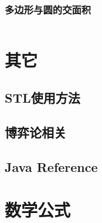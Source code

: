 \documentclass[a4paper,openany]{book}
\newcommand{\cppcode}[1]{
    \inputminted[mathescape,
    			 tabsize=4,
    			 linenos,
    			 frame=single,
    			 framesep=2mm,
    			 breakaftergroup=true,
    			 breakautoindent=true,
    			 breakbytoken=true,
    			 breaklines=true
    ]{cpp}{#1}
}
\begin{document}
\begin{spacing}{1.0}
			\subsection{多边形与圆的交面积}
				\cppcode{Source/Computational-Geometry/Polygon-Circle-Intersection.cpp}
	\chapter{其它}
		\section{STL使用方法}
			
		\section{博弈论相关}
			
		\section{Java Reference}
			
	\chapter{数学公式}
		
	\end{spacing}
\end{document}
